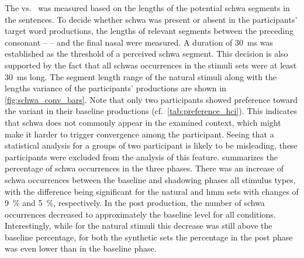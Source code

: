 The \textipa{[\s{n}]} vs.\ \textipa{[@n]} was measured based on the lengths of the potential schwa segments in the sentences.
To decide whether schwa was present or absent in the participants' target word productions, the lengths of relevant segments between the preceding consonant --  -- and the final nasal were measured.
A duration of \SI{30}{\milli\second} was established as the threshold of a perceived schwa segment.
This decision is also supported by the fact that all schwas occurrences in the stimuli sets were at least \SI{30}{\milli\second} long.
The segment length range of the natural stimuli along with the lengths variance of the participants' productions are shown in \cref{fig:schwa_conv_bars}.
Note that only two participants showed preference toward the \textipa{[@n]} variant in their baseline productions (cf.\ \cref{tab:preference_hci}).
This indicates that schwa does not commonly appear in the examined context, which might make it harder to trigger convergence among the participant.
Seeing that a statistical analysis for a groups of two participant is likely to be misleading, these participants were excluded from the analysis of this feature.
 summarizes the percentage of schwa occurrences in the three phases.
There was an increase of schwa occurrences between the baseline and shadowing phases all stimulus types, with the difference being significant for the natural and \ac{hmm} sets with changes of \SI{9}{\percent} and \SI{5}{\percent}, respectively.
In the post production, the number of schwa occurrences decreased to approximately the baseline level for all conditions.
Interestingly, while for the natural stimuli this decrease was still above the baseline percentage, for both the synthetic sets the percentage in the post phase was even lower than in the baseline phase.
%
